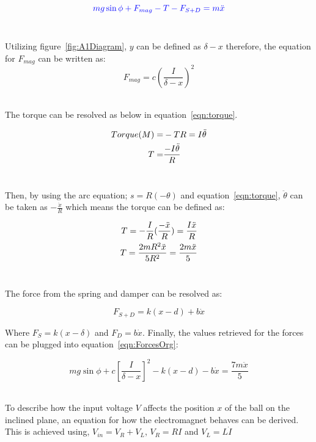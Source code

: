 \documentclass[a4paper,10pt,reqno]{amsart}
\numberwithin{equation}{section}
\begin{document}
\begin{equation}
\label{eqn:ForcesOrg}
    \color{blue}{mg\sin{\phi}+F_{mag}-T-F_{S+D}=m\ddot{x}}\color{black}
\end{equation}
\\
\par Utilizing figure~\ref{fig:A1Diagram}, $y$ can be defined as $\delta-x$ therefore, the equation for $F_{mag}$ can be written as:
\begin{equation}
    F_{mag} = c(\frac{I}{\delta-x})^2
\end{equation}
\\
\par The torque can be resolved as below in equation~\ref{eqn:torque}.

\begin{align}
    Torque(M)=&-TR=I\ddot{\theta}
    \notag\\
    T =& \frac{-I\ddot{\theta}}{R}
    \label{eqn:torque}
\end{align}
\\
\par Then, by using the arc equation; $s=R(-\theta)$ and equation~\ref{eqn:torque}, $\ddot{\theta}$ can be taken as $-\frac{\ddot{x}}{R}$ which means the torque can be defined as:

\begin{align}
    T=-\frac{I}{R}(\frac{-\ddot{x}}{R}) = \frac{I\ddot{x}}{R}
    \notag\\
    T = \frac{2mR^2\ddot{x}}{5R^2} = \frac{2m\ddot{x}}{5}
\end{align}
\\
\par The force from the spring and damper can be resolved as:

\begin{equation}
    F_{S+D}=k(x-d)+b\dot{x}
\end{equation}

\par Where $F_{S}=k(x-\delta)$ and $F_D=b\dot{x}$. Finally, the values retrieved for the forces can be plugged into equation~\ref{eqn:ForcesOrg}:

\begin{equation}
    mg\sin{\phi}+c[\frac{I}{\delta-x}]^2-k(x-d)-b\dot{x}=\frac{7m\ddot{x}}{5}
\end{equation}
\\
\par To describe how the input voltage $V$ affects the position $x$ of the ball on the inclined plane, an equation for how the electromagnet behaves can be derived. This is achieved using, $V_{in}=V_R+V_L$, $V_R=RI$ and $V_L=L\dot{I}$
\end{document}
